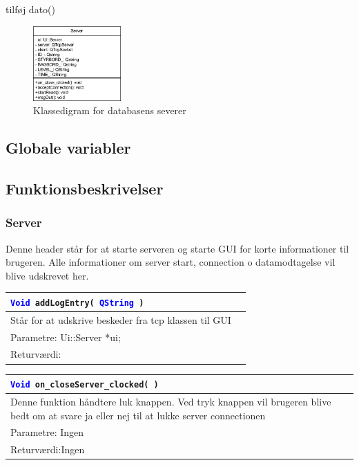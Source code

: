 tilføj dato()
\begin{figure}[htbp]
	\centering
	\includegraphics[width=0.3\textwidth]{billeder/serverKlassediagram}
	\caption{Klassedigram for databasens severer}
	\label{fig:serverKlassediagram}
\end{figure}

\subsection{Globale variabler}


\subsection{Funktionsbeskrivelser}
\subsubsection{Server}
Denne header står for at starte serveren og starte GUI for korte informationer til brugeren. Alle informationer om server start, connection o datamodtagelse vil blive udskrevet her. 

\begin{table}[H]
\begin{tabular}{l p{12.5cm}}
\multicolumn{2}{l}{\texttt{\textcolor{blue}{Void} addLogEntry( \textcolor{blue}{QString} )}} \\
\hline
Står for at udskrive beskeder fra tcp klassen til GUI \\
Parametre: Ui::Server *ui;\\
Returværdi:&\\
\end{tabular}
\end{table}

\begin{table}[H]
\begin{tabular}{l p{12.5cm}}
\multicolumn{2}{l}{\texttt{\textcolor{blue}{Void} on\_closeServer\_clocked( )}} \\
\hline
Denne funktion håndtere luk knappen. Ved tryk knappen vil brugeren blive bedt om at svare ja eller nej til at lukke server connectionen \\
Parametre: Ingen\\
Returværdi:Ingen\\
\end{tabular}
\end{table}

